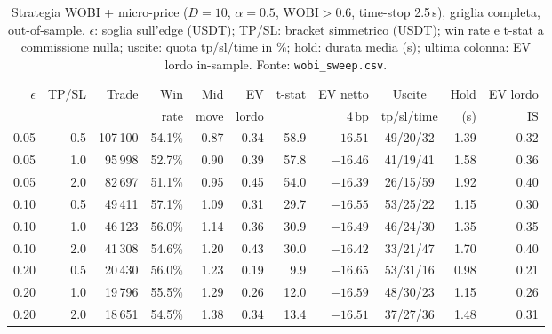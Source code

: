 \documentclass[a4paper,11pt]{article}
\newcommand{\WOBI}{\mathrm{WOBI}}
\newcommand{\bp}{\ensuremath{\,\mathrm{bp}}}
\newcommand{\code}[1]{\texttt{#1}}
\begin{document}
\begin{table}[H]
\centering
\footnotesize
\caption{Strategia WOBI + micro-price ($D=10$, $\alpha=0.5$, $\WOBI > 0.6$, time-stop 2.5\,s),
griglia completa, out-of-sample. $\epsilon$: soglia sull'edge (USDT); TP/SL: bracket simmetrico
(USDT); win rate e t-stat a commissione nulla; uscite: quota tp/sl/time in \%; hold: durata
media (s); ultima colonna: EV lordo in-sample. Fonte: \code{wobi\_sweep.csv}.}
\label{tab:wobi-full}
\setlength{\tabcolsep}{4pt}
\begin{tabular}{@{}rrrrrrrrcrr@{}}
\toprule
$\epsilon$ & TP/SL & Trade & Win & Mid & EV & t-stat & EV netto & Uscite & Hold & EV lordo \\
 & & & rate & move & lordo & & 4\bp & tp/sl/time & (s) & IS \\
\midrule
0.05 & 0.5 & 107\,100 & 54.1\% & 0.87 & 0.34 & 58.9 & $-16.51$ & 49/20/32 & 1.39 & 0.32 \\
0.05 & 1.0 & 95\,998  & 52.7\% & 0.90 & 0.39 & 57.8 & $-16.46$ & 41/19/41 & 1.58 & 0.36 \\
0.05 & 2.0 & 82\,697  & 51.1\% & 0.95 & 0.45 & 54.0 & $-16.39$ & 26/15/59 & 1.92 & 0.40 \\
0.10 & 0.5 & 49\,411  & 57.1\% & 1.09 & 0.31 & 29.7 & $-16.55$ & 53/25/22 & 1.15 & 0.30 \\
0.10 & 1.0 & 46\,123  & 56.0\% & 1.14 & 0.36 & 30.9 & $-16.49$ & 46/24/30 & 1.35 & 0.35 \\
0.10 & 2.0 & 41\,308  & 54.6\% & 1.20 & 0.43 & 30.0 & $-16.42$ & 33/21/47 & 1.70 & 0.40 \\
0.20 & 0.5 & 20\,430  & 56.0\% & 1.23 & 0.19 & 9.9  & $-16.65$ & 53/31/16 & 0.98 & 0.21 \\
0.20 & 1.0 & 19\,796  & 55.5\% & 1.29 & 0.26 & 12.0 & $-16.59$ & 48/30/23 & 1.15 & 0.26 \\
0.20 & 2.0 & 18\,651  & 54.5\% & 1.38 & 0.34 & 13.4 & $-16.51$ & 37/27/36 & 1.48 & 0.31 \\
\bottomrule
\end{tabular}
\end{table}
\end{document}
